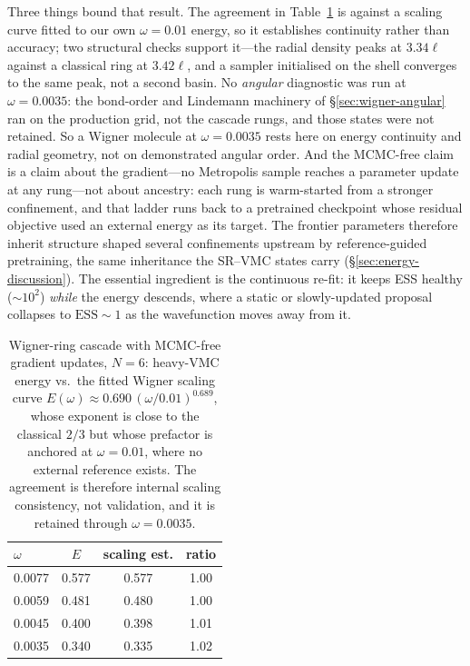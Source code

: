 Three things bound that result. The agreement in Table~\ref{tab:cascade} is against a
scaling curve fitted to our own $\omega=0.01$ energy, so it establishes continuity rather
than accuracy; two structural checks support it---the radial density peaks at $3.34\ell$
against a classical ring at $3.42\ell$, and a sampler initialised on the shell converges to the same peak, not a second basin. No \emph{angular} diagnostic was run at
$\omega=0.0035$: the bond-order and Lindemann machinery of \S\ref{sec:wigner-angular} ran on
the production grid, not the cascade rungs, and those states were not retained. So a Wigner
molecule at $\omega=0.0035$ rests here on energy continuity and radial geometry, not on
demonstrated angular order. And the MCMC-free claim is a claim about the gradient---no
Metropolis sample reaches a parameter update at any rung---not about ancestry: each rung is
warm-started from a stronger confinement, and that ladder runs back to a pretrained
checkpoint whose residual objective used an external energy as its target. The frontier
parameters therefore inherit structure shaped several confinements upstream by
reference-guided pretraining, the same inheritance the SR--VMC states carry
(\S\ref{sec:energy-discussion}). The essential ingredient is the continuous re-fit: it keeps ESS healthy
($\sim\!10^2$) \emph{while} the energy descends, where a static or slowly-updated proposal
collapses to $\mathrm{ESS}\!\sim\!1$ as the wavefunction moves away from it.

\begin{table}[htbp]\centering
\caption[MCMC-free Wigner-ring cascade, $N{=}6$]{Wigner-ring cascade with MCMC-free gradient updates, $N=6$: heavy-VMC energy vs.\ the fitted Wigner
scaling curve $E(\omega)\approx 0.690\,(\omega/0.01)^{0.689}$, whose exponent is close to
the classical $2/3$ but whose prefactor is anchored at $\omega=0.01$, where no external
reference exists. The agreement is therefore internal scaling consistency, not validation,
and it is retained through $\omega=0.0035$.}
\label{tab:cascade}
\begin{tabular}{lccc}
\hline
$\omega$ & $E$ & scaling est. & ratio \\
\hline
0.0077 & 0.577 & 0.577 & 1.00 \\
0.0059 & 0.481 & 0.480 & 1.00 \\
0.0045 & 0.400 & 0.398 & 1.01 \\
0.0035 & 0.340 & 0.335 & 1.02 \\
\hline
\end{tabular}
\end{table}


